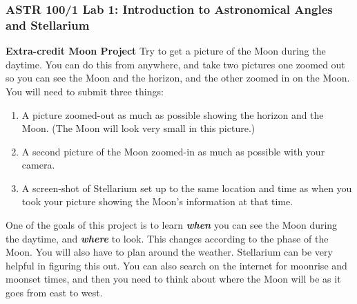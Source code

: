 \documentclass[main.tex]{subfiles}
\begin{document}
\subsubsection{ASTR 100/1 Lab 1: Introduction to Astronomical Angles and Stellarium}

\textbf{Extra-credit Moon Project}
\newline
Try to get a picture of the Moon during the daytime. You can do this from anywhere, and take two pictures one zoomed out so you can see the Moon and the horizon, and the other zoomed in on the Moon. You will need to submit three things:
\begin{enumerate}
\item A picture zoomed-out as much as possible showing the horizon and the Moon. (The Moon will look very small in this picture.)
\item A second picture of the Moon zoomed-in as much as possible with your camera.
\item A screen-shot of Stellarium set up to the same location and time as when you took your picture showing the Moon's information at that time.
\end{enumerate}
One of the goals of this project is to learn \textit{\textbf{when}} you can see the Moon during the daytime, and \textbf{\textit{where}} to look. This changes according to the phase of the Moon. You will also have to plan around the weather. Stellarium can be very helpful in figuring this out. You can also search on the internet for moonrise and moonset times, and then you need to think about where the Moon will be as it goes from east to west.  
\end{document}
